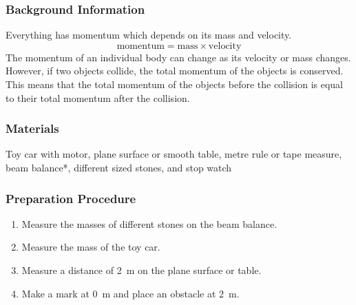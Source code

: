 \subsubsection*{Background Information}
Everything has momentum which depends on its mass and velocity.  
$$\mathrm{momentum} = \mathrm{mass} \times \mathrm{velocity}$$ 
The momentum of an individual body can change as its velocity or mass changes. However, if two objects collide, the total momentum of the objects is conserved.  This means that the total momentum of the objects before the collision is equal to their total momentum after the collision.

\subsubsection*{Materials}
Toy car with motor, plane surface or smooth table, metre rule or tape measure, beam balance*, different sized stones, and stop watch

\subsubsection*{Preparation Procedure}
\begin{enumerate}
\item{Measure the masses of different stones on the beam balance.}
\item{Measure the mass of the toy car.}
\item{Measure a distance of 2~m on the plane surface or table.}
\item{Make a mark at 0~m and place an obstacle at 2~m.}
\end{enumerate}

